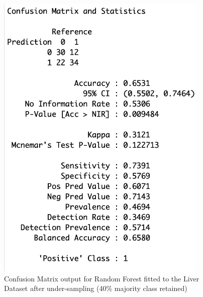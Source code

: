 \begin{figure}[!htbp]
\begin{minipage}{0.45\textwidth}
        \includegraphics[width=0.9\textwidth]{ThesisTemplate/appendix/images/Chapter5Appendix/ConfusionMatrix40/Liver.png}
        \caption{Confusion Matrix output for Random Forest fitted to the Liver Dataset after under-sampling (40\% majority class retained)}
        \label{fig:my_label}
    \end{minipage}
\end{figure}

